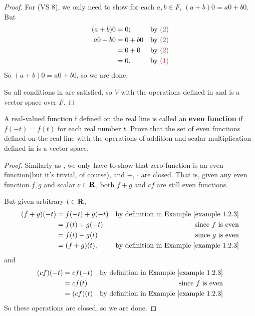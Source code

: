 \begin{proof}
For (VS 8), we only need to show for each \(a, b \in F\), \((a + b)0 = a0 + b0\).
But
\begin{align*}
    (a + b)0 & = 0; & \text{by \MAROON{(2)}} \\
     a0 + b0 & = 0 + b0 & \text{by \MAROON{(2)}} \\
             & = 0 + 0 & \text{by \MAROON{(2)}} \\
             & = 0. & \text{by \MAROON{(1)}}
\end{align*}
So \((a + b)0 = a0 + b0\), so we are done.

So all conditions in  are satisfied, so \(V\) with the operations defined in  and  is a vector space over \(F\).
\end{proof}

\begin{exercise} \label{exercise 1.2.12}
A real-valued function f defined on the real line is called an \textbf{even function} if \(f(-t) = f(t)\) for each real number \(t\).
Prove that the set of even functions defined on the real line with the operations of addition and scalar multiplication defined in  is a vector space.
\end{exercise}

\begin{proof}
Similarly as , we only have to show that zero function is an even function(but it's trivial, of course), and \(+\), \(\cdot\) are closed.
That is, given any even function \(f, g\) and scalar \(c \in \mathbf{R}\), both \(f + g\) and \(c f\) are still even functions.

But given arbitrary \(t \in \mathbf{R}\),
\begin{align*}
    (f + g)(-t) & = f(-t) + g(-t) & \text{by definition in \EXAMPLE{1.2.3}} \\
                & = f(t) + g(-t) & \text{since \(f\) is even} \\
                & = f(t) + g(t) & \text{since \(g\) is even} \\
                & = (f + g)(t), & \text{by definition in \EXAMPLE{1.2.3}}
\end{align*}
and
\begin{align*}
    (cf)(-t) & = cf(-t) & \text{by definition in \EXAMPLE{1.2.3}} \\
                & = cf(t) & \text{since \(f\) is even} \\
                & = (cf)(t) & \text{by definition in \EXAMPLE{1.2.3}}
\end{align*}
So these operations are closed, so we are done.
\end{proof}


